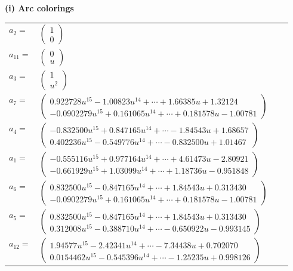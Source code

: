 \documentclass[1p]{elsarticle_modified}
\theoremstyle{definition}
\begin{document}
\flushleft \textbf{(i) Arc colorings}\\
\begin{tabular}{m{7pt} m{180pt} m{7pt} m{180pt} }
\flushright $a_{2}=$&$\begin{pmatrix}1\\0\end{pmatrix}$ \\
\flushright $a_{11}=$&$\begin{pmatrix}0\\u\end{pmatrix}$ \\
\flushright $a_{3}=$&$\begin{pmatrix}1\\u^2\end{pmatrix}$ \\
\flushright $a_{7}=$&$\begin{pmatrix}0.922728 u^{15}-1.00823 u^{14}+\cdots+1.66385 u+1.32124\\-0.0902279 u^{15}+0.161065 u^{14}+\cdots+0.181578 u-1.00781\end{pmatrix}$ \\
\flushright $a_{4}=$&$\begin{pmatrix}-0.832500 u^{15}+0.847165 u^{14}+\cdots-1.84543 u+1.68657\\0.402236 u^{15}-0.549776 u^{14}+\cdots-0.832500 u+1.01467\end{pmatrix}$ \\
\flushright $a_{1}=$&$\begin{pmatrix}-0.555116 u^{15}+0.977164 u^{14}+\cdots+4.61473 u-2.80921\\-0.661929 u^{15}+1.03099 u^{14}+\cdots+1.18736 u-0.951848\end{pmatrix}$ \\
\flushright $a_{6}=$&$\begin{pmatrix}0.832500 u^{15}-0.847165 u^{14}+\cdots+1.84543 u+0.313430\\-0.0902279 u^{15}+0.161065 u^{14}+\cdots+0.181578 u-1.00781\end{pmatrix}$ \\
\flushright $a_{5}=$&$\begin{pmatrix}0.832500 u^{15}-0.847165 u^{14}+\cdots+1.84543 u+0.313430\\0.312008 u^{15}-0.388710 u^{14}+\cdots-0.650922 u-0.993145\end{pmatrix}$ \\
\flushright $a_{12}=$&$\begin{pmatrix}1.94577 u^{15}-2.42341 u^{14}+\cdots-7.34438 u+0.702070\\0.0154462 u^{15}-0.545396 u^{14}+\cdots-1.25235 u+0.998126\end{pmatrix}$ \\

\end{tabular}
\end{document}
